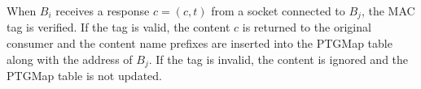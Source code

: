 When $B_i$ receives a response $c = (c,t)$ from a socket connected to $B_j$, the MAC tag is verified. If the tag is valid, the content $c$ is returned to the original consumer and the content name prefixes are inserted into the {\sf PTGMap} table along with the address of $B_j$. If the tag is invalid, the content is ignored and the {\sf PTGMap} table is not updated. 

